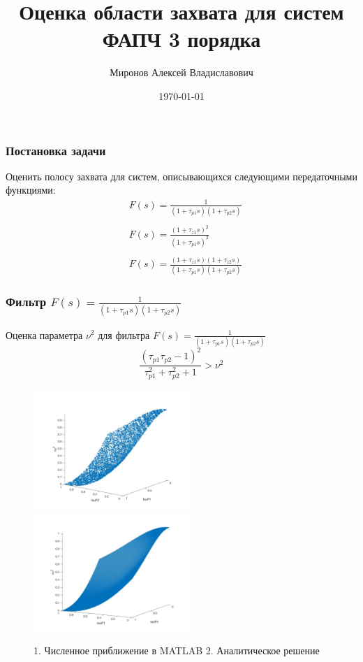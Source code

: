 \documentclass{beamer}
\title[Оценка области захвата для систем]{Оценка области захвата для систем ФАПЧ 3 порядка} %
\author{Миронов Алексей Владиславович} %
\institute[СПБГУ] %
{
Санкт-Петербургский государственный университет\\ %
\vspace{0.7cm}
    Научный руководитель:  д.ф.-м. н., профессор Юлдашев Р. В. \\
    \vspace{0.7cm}
}
\date{\today} %
\begin{document}
\begin{frame}
\titlepage %
\end{frame}


\begin{frame}
\frametitle{Постановка задачи}
Оценить полосу захвата для систем, описывающихся следующими передаточными функциями:
 \begin{equation*}
 \begin{aligned}
&F(s) = \frac{1}{(1+\tau_{p1}s)(1+\tau_{p2}s)}\\
&\\
&F(s) = \frac{(1+\tau_{z1}s)^2}{(1+\tau_{p1}s)^2}\\
&\\
&F(s) = \frac{(1+\tau_{z1}s)(1+\tau_{z2}s)}{(1+\tau_{p1}s)(1+\tau_{p2}s)}
 \end{aligned}
\end{equation*}
\end{frame}


\begin{frame}
\frametitle{Фильтр $F(s) = \frac{1}{(1+\tau_{p1}s)(1+\tau_{p2}s)}$}
Оценка параметра $\nu^2$ для фильтра $F(s) = \frac{1}{(1+\tau_{p1}s)(1+\tau_{p2}s)}$
\begin{equation*}
\frac{(\tau_{p1}\tau_{p2} - 1)^2}{\tau_{p1}^2 + \tau_{p2}^2 + 1} > \nu^2
\end{equation*} 
\begin{figure}[H]
\includegraphics[width=6cm]{../images/filter1e.jpg}%
\includegraphics[width=6cm]{../images/filter1_1.jpg}%
\caption{1. Численное приближение в MATLAB 2. Аналитическое решение}
\end{figure}
\end{frame}
\end{document}
